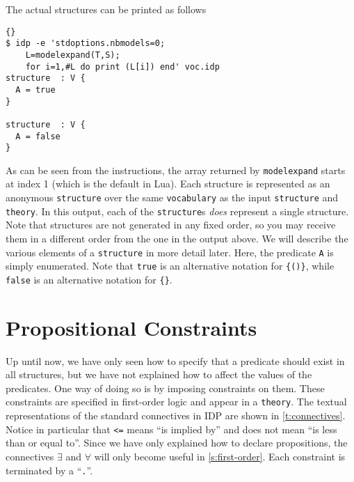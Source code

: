 \documentclass{article}
\newcommand{\idp}{{\sc IDP}\xspace}
\begin{document}
The actual structures can be printed as follows
\begin{lstlisting}{}
$ idp -e 'stdoptions.nbmodels=0;
    L=modelexpand(T,S);
    for i=1,#L do print (L[i]) end' voc.idp 
structure  : V {
  A = true
}

structure  : V {
  A = false
}

\end{lstlisting}
As can be seen from the instructions, the array
returned by \lstinline{modelexpand}
starts at index 1 (which is the default in Lua).
Each structure is represented as an anonymous \texttt{structure} over the same
\texttt{vocabulary} as the input \texttt{structure} and \texttt{theory}.
In this output, each of the \texttt{structure}s \emph{does} represent
a single structure.
Note that structures are not generated in any fixed order,
so you may receive them in a different order from the one in the output
above.
We will describe the various elements of a \texttt{structure} in more
detail later.  Here, the predicate \texttt{A} is simply enumerated.
Note that \texttt{true} is an alternative notation
for \lstinline!{()}!, while \texttt{false} is an alternative notation
for \lstinline!{}!.

\section{Propositional Constraints}\label{s:propositional}

Up until now, we have only seen how to specify that a predicate
should exist in all structures, but we have not explained how
to affect the values of the predicates.
One way of doing so is by imposing constraints on them.
These constraints are specified in first-order logic and appear
in a \texttt{theory}.
The textual representations of the standard connectives
in \idp are shown in \autoref{t:connectives}.
Notice in particular that \texttt{<=} means ``is implied by''
and does not mean ``is less than or equal to''.
Since we have only explained how to declare propositions,
the connectives $\exists$ and $\forall$ will only become useful
in \autoref{s:first-order}.
Each constraint is terminated by a ``\texttt{.}''.
\end{document}
